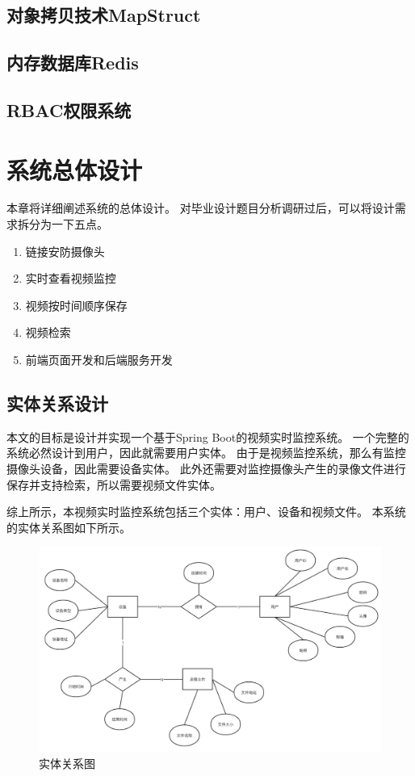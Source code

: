 \section{对象拷贝技术MapStruct}

\section{内存数据库Redis}

\section{RBAC权限系统}


\chapter{系统总体设计}
本章将详细阐述系统的总体设计。
对毕业设计题目分析调研过后，可以将设计需求拆分为一下五点。
\begin{enumerate}
    \item  链接安防摄像头
    \item 实时查看视频监控
    \item 视频按时间顺序保存
    \item 视频检索
    \item 前端页面开发和后端服务开发
    
\end{enumerate}

\section{实体关系设计}
本文的目标是设计并实现一个基于Spring Boot的视频实时监控系统。
一个完整的系统必然设计到用户，因此就需要用户实体。
由于是视频监控系统，那么有监控摄像头设备，因此需要设备实体。
此外还需要对监控摄像头产生的录像文件进行保存并支持检索，所以需要视频文件实体。

综上所示，本视频实时监控系统包括三个实体：用户、设备和视频文件。
本系统的实体关系图如下所示。

\begin{figure}[ht]
    \centering
    \includegraphics[width=0.5\linewidth]{./Figure/IMG_erd.png}
    \caption{实体关系图}\label{Fig:erd}
\end{figure}

